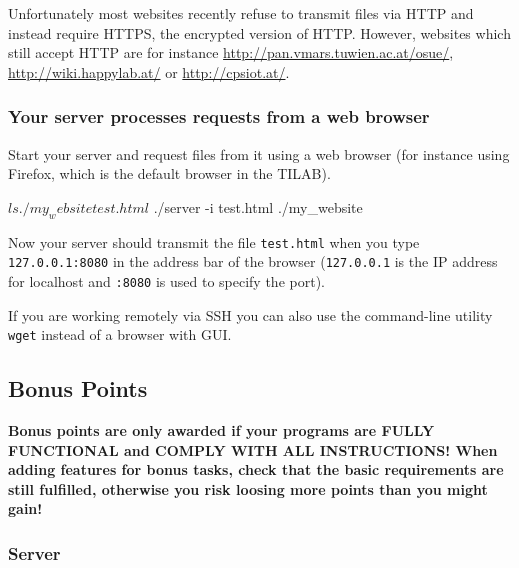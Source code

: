 Unfortunately most websites recently refuse to transmit files via HTTP
and instead require HTTPS, the encrypted version of HTTP.
However, websites which still accept HTTP are for instance
\url{http://pan.vmars.tuwien.ac.at/osue/},
\url{http://wiki.happylab.at/} or \url{http://cpsiot.at/}.

\subsubsection*{Your server processes requests from a web browser}

\vspace{-4mm}
Start your server and request files from it using a web browser
(for instance using Firefox, which is the default browser in the TILAB).

\begin{osuefmtcode}
    $ ls ./my_website
    test.html
    $ ./server -i test.html ./my_website
\end{osuefmtcode}

Now your server should transmit the file \verb|test.html|
when you type \verb|127.0.0.1:8080| in the address bar of the browser
(\verb|127.0.0.1| is the IP address for localhost
and \verb|:8080| is used to specify the port).

If you are working remotely via SSH
you can also use the command-line utility \verb|wget|
instead of a browser with GUI.

\clearpage
\subsection*{Bonus Points}

\vspace{-3mm}
\textbf{Bonus points are only awarded
if your programs are FULLY FUNCTIONAL
and COMPLY WITH ALL INSTRUCTIONS!
When adding features for bonus tasks,
check that the basic requirements are still fulfilled,
otherwise you risk loosing more points than you might gain!
}

\subsubsection*{Server}


